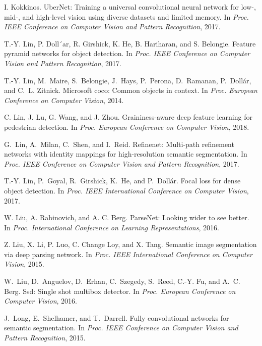\documentclass[10pt,twocolumn,letterpaper]{article}
\begin{document}
\begin{thebibliography}{10}
I. Kokkinos.
\newblock UberNet: Training a universal convolutional neural network for low-, mid-, and high-level vision using
diverse datasets and limited memory.
\newblock In {\em Proc. IEEE Conference on Computer Vision and Pattern Recognition}, 2017.

T.-Y. Lin, P. Doll´ar, R. Girshick, K. He, B. Hariharan, and S. Belongie.
\newblock Feature pyramid networks for object detection.
\newblock In {\em Proc. IEEE Conference on Computer Vision and Pattern Recognition}, 2017.  

T.-Y. Lin, M.~Maire, S.~Belongie, J.~Hays, P.~Perona, D.~Ramanan,
  P.~Doll{\'a}r, and C.~L. Zitnick.
\newblock Microsoft coco: Common objects in context.
\newblock In {\em Proc. European Conference on Computer Vision}, 2014.

C. Lin, J. Lu, G. Wang, and J. Zhou.
Graininess-aware deep feature learning for pedestrian detection.
\newblock In {\em Proc. European Conference on Computer Vision}, 2018. 

G.~Lin, A.~Milan, C.~Shen, and I.~Reid.
\newblock Refinenet: Multi-path refinement networks with identity mappings for high-resolution semantic segmentation.
\newblock In {\em Proc. IEEE Conference on Computer Vision and Pattern Recognition}, 2017.

T.-Y. Lin, P.~Goyal, R.~Girshick, K.~He, and P.~Doll{\'a}r.
\newblock Focal loss for dense object detection.
\newblock In {\em Proc. IEEE International Conference on Computer Vision}, 2017.

W. Liu, A. Rabinovich, and A. C. Berg.
ParseNet: Looking wider to see better.
\newblock In {\em Proc. International Conference on Learning Representations}, 2016.

Z. Liu, X. Li, P. Luo, C. Change Loy, and X. Tang.
Semantic image segmentation via deep parsing network.
\newblock In {\em Proc. IEEE International Conference on Computer Vision}, 2015.

W.~Liu, D.~Anguelov, D.~Erhan, C.~Szegedy, S.~Reed, C.-Y. Fu, and A.~C. Berg.
\newblock Ssd: Single shot multibox detector.
\newblock In {\em Proc. European Conference on Computer Vision}, 2016.

J.~Long, E.~Shelhamer, and T.~Darrell.
\newblock Fully convolutional networks for semantic segmentation.
\newblock In {\em Proc. IEEE Conference on Computer Vision and  Pattern Recognition}, 2015.


\end{thebibliography}
\end{document}
